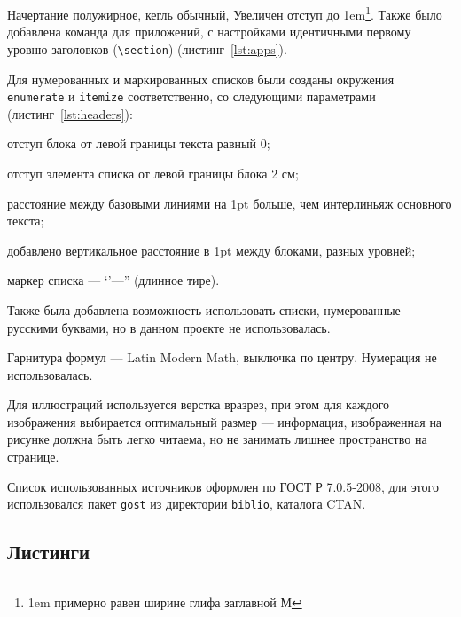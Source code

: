 Начертание полужирное, кегль обычный, Увеличен отступ до 1em\footnote{1em примерно равен ширине глифа заглавной М}. Также было добавлена команда \texttt{\app} для приложений, с настройками идентичными первому уровню заголовков (\texttt{\textbackslash section}) (листинг~\ref{lst:apps}).



Для нумерованных и маркированных списков были созданы окружения \texttt{enumerate\*} и \texttt{itemize\*} соответственно, со следующими параметрами (листинг~\ref{lst:headers}):

\begin{itemize*}
	\item отступ блока от левой границы текста равный 0;
	\item отступ элемента списка от левой границы блока 2 см;
	\item расстояние между базовыми линиями на 1pt больше, чем интерлиньяж основного текста;
	\item добавлено вертикальное расстояние в 1pt между блоками, разных уровней;
	\item маркер списка --- `'---'' (длинное тире).
\end{itemize*}

Также была добавлена возможность использовать списки, нумерованные русскими буквами, но в данном проекте не использовалась.


Гарнитура формул --- Latin Modern Math, выключка по центру. Нумерация не использовалась.

Для иллюстраций используется верстка вразрез, при этом для каждого изображения выбирается оптимальный размер --- информация, изображенная на рисунке должна быть легко читаема, но не занимать лишнее пространство на странице.

Список использованных источников оформлен по ГОСТ Р 7.0.5-2008\cite{GOST705}, для этого использовался пакет \texttt{gost} из директории \texttt{biblio}, каталога CTAN.

\subsection{Листинги}
\label{sec:listings}

